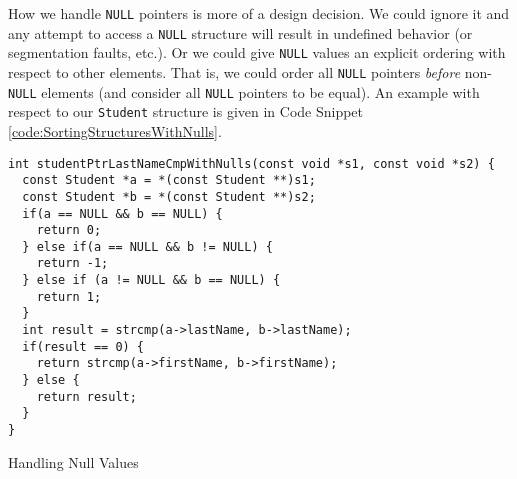 How we handle \texttt{NULL} pointers is more of a design 
decision.  We could ignore it and any attempt to access a 
\texttt{NULL} structure will result in undefined
behavior (or segmentation faults, etc.).  Or we could give 
\texttt{NULL} values an explicit ordering with respect to 
other elements.  That is, we could order all \texttt{NULL}
pointers \emph{before} non-\texttt{NULL} elements (and consider 
all \texttt{NULL} pointers to be equal).  An example with respect 
to our \texttt{Student} structure is given in Code Snippet 
\ref{code:SortingStructuresWithNulls}.

\begin{listing}[H]
\begin{verbatim}
int studentPtrLastNameCmpWithNulls(const void *s1, const void *s2) {
  const Student *a = *(const Student **)s1;
  const Student *b = *(const Student **)s2;
  if(a == NULL && b == NULL) {
    return 0;
  } else if(a == NULL && b != NULL) {
    return -1;
  } else if (a != NULL && b == NULL) {
    return 1;
  }
  int result = strcmp(a->lastName, b->lastName);
  if(result == 0) {
    return strcmp(a->firstName, b->firstName);
  } else {
    return result;
  }
}
\end{verbatim}
\caption{Handling Null Values}
\label{code:SortingStructuresWithNulls}
\end{listing}

